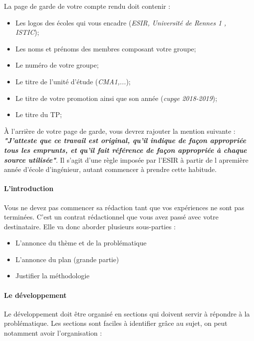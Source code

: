 \documentclass[11pt]{article}
\providecommand{\tightlist}{%
      \setlength{\itemsep}{0pt}\setlength{\parskip}{0pt}}
\begin{document}
La page de garde de votre compte rendu doit contenir :

\begin{itemize}
\tightlist
\item
  Les logos des écoles qui vous encadre (\emph{ESIR, Université de
  Rennes 1 , ISTIC});
\item
  Les noms et prénoms des membres composant votre groupe;
\item
  Le numéro de votre groupe;
\item
  Le titre de l'unité d'étude (\emph{CMA1,...});
\item
  Le titre de votre promotion ainsi que son année (\emph{cupge
  2018-2019});
\item
  Le titre du TP;
\end{itemize}

À l'arrière de votre page de garde, vous devrez rajouter la mention
suivante : \textbf{\emph{"J'atteste que ce travail est original, qu'il
indique de façon appropriée tous les emprunts, et qu'il fait référence
de façon appropriée à chaque source utilisée"}}. Il s'agit d'une règle
imposée par l'ESIR à partir de l apremière année d'école d'ingénieur,
autant commencer à prendre cette habitude.

\paragraph{L'introduction}\label{lintroduction}

Vous ne devez pas commencer sa rédaction tant que vos expériences ne
sont pas terminées. C'est un contrat rédactionnel que vous avez passé
avec votre destinataire. Elle va donc aborder plusieurs sous-parties :

\begin{itemize}
\tightlist
\item
  L'annonce du thème et de la problématique
\item
  L'annonce du plan (grande partie)
\item
  Justifier la méthodologie
\end{itemize}

\paragraph{Le développement}\label{le-duxe9veloppement}

Le développement doit être organisé en sections qui doivent servir à
répondre à la problématique. Les sections sont faciles à identifier
grâce au sujet, on peut notamment avoir l'organisation :
\end{document}
